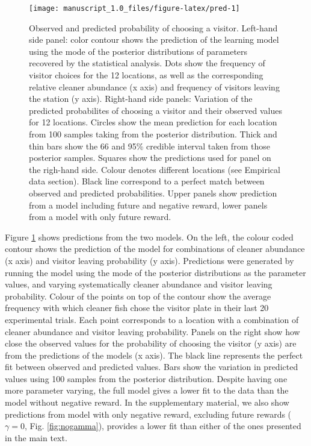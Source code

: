 \documentclass[]{rsos}%
\begin{document}
\begin{figure}

{\centering \texttt{[image: manuscript\_1.0\_files/figure-latex/pred-1]} 

}

\caption{Observed and predicted probability of choosing a visitor. Left-hand side panel: color contour shows the prediction of the learning model using the mode of the posterior distributions of parameters recovered by the statistical analysis. Dots show the frequency of visitor choices for the 12 locations, as well as the corresponding relative cleaner abundance (x axis) and frequency of visitors leaving the station (y axis). Right-hand side panels: Variation of the predicted probabilites  of choosing a visitor and their observed values for 12 locations. Circles show the mean prediction for each location from 100 samples taking from the posterior distribution. Thick and thin bars show the 66 and 95\% credible interval taken from those posterior samples. Squares show the predictions used for panel on the righ-hand side. Colour denotes different locations (see Empirical data section). Black line correspond to a perfect match between observed and predicted probabilities. Upper panels show prediction from a model including future and negative reward, lower panels from a  model with only future reward.}\label{fig:pred}
\end{figure}

Figure \ref{fig:pred} shows predictions from the two models. On the
left, the colour coded contour shows the prediction of the model for
combinations of cleaner abundance (x axis) and visitor leaving
probability (y axis). Predictions were generated by running the model
using the mode of the posterior distributions as the parameter values,
and varying systematically cleaner abundance and visitor leaving
probability. Colour of the points on top of the contour show the average
frequency with which cleaner fish chose the visitor plate in their last
20 experimental trials. Each point corresponds to a location with a
combination of cleaner abundance and visitor leaving probability. Panels
on the right show how close the observed values for the probability of
choosing the visitor (y axis) are from the predictions of the models (x
axis). The black line represents the perfect fit between observed and
predicted values. Bars show the variation in predicted values using 100
samples from the posterior distribution. Despite having one more
parameter varying, the full model
gives a lower fit to the data than the model without negative reward.
In the supplementary material, we also show predictions from
model with only negative reward, excluding future rewards (\(\gamma=0\),
Fig. \ref{fig:nogamma}), provides a lower fit than either of the ones
presented in the main text.
\end{document}
